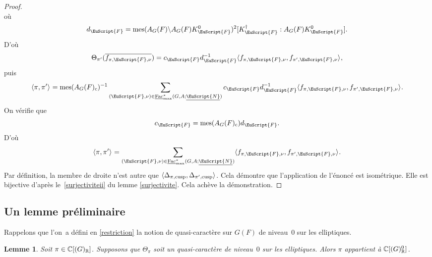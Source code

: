 \documentclass[JEP,XML,SOM,Unicode,francais]{cedram}
\let\mathcal \EuScript
\newcommand{\NoChangel}[1]{%
\expandafter\let\csname old\string#1\endcsname=#1
\let#1=\relax
\newcommand{#1}{\mathcode`l="716C\csname old\string#1\endcsname\mathcode`l="7160 }%
}
\let\<\langle
\let\>\rangle
\newcommand{\rc}{\mathrm{c}}
\newcommand{\cusp}{\mathrm{cusp}}
\newcommand{\rell}{\mathrm{ell}} \NoChangel{\rell}
\newcommand{\Ell}{\mathrm{Ell}} \NoChangel{\Ell}
\newcommand{\Fac}{\mathrm{Fac}}
\DeclareMathOperator{\mes}{mes}
\newcommand{\cF}{\mathcal{F}}
\newcommand{\cN}{\mathcal{N}}
\newcommand{\CC}{\mathbb{C}}
\newcommand{\RR}{\mathbb{R}}
\theoremstyle{plain}
\newtheorem*{lem*}{Lemme}
\theoremstyle{definition}
\begin{document}
\begin{proof}
\[\]
où
\[
d_{\cF}=\mes(A_{G}(F)\backslash A_{G}(F)K_{\cF}^0)^2[K_{\cF}^{\dag}:A_{G}(F)K_{\cF}^0].
\]
D'où
\[
\Theta_{\pi'}(\overline{f_{\pi,\cF,\nu}})= c_{\cF}d_{\cF}^{-1}\<f_{\pi,\cF,\nu},f_{\pi',\cF,\nu}\>_{\rell},
\]
puis
\[
\<\pi,\pi'\>_{\rell}=\mes(A_{G}(F)_{\rc})^{-1}\sum_{(\cF,\nu)\in \underline{\Fac}^*_{\max}(G,A;\underline{\cN})} c_{\cF}d_{\cF}^{-1}\<f_{\pi,\cF,\nu},f_{\pi',\cF,\nu}\>_{\rell}.
\]
On vérifie que
\[
c_{\cF}=\mes(A_{G}(F)_{\rc}) d_{\cF}.
\]
D'où
\[
\<\pi,\pi'\>_{\rell}=\sum_{(\cF,\nu)\in \underline{\Fac}^*_{\max}(G,A;\underline{\cN})}\<f_{\pi,\cF,\nu},f_{\pi',\cF,\nu}\>_{\rell}.
\]
Par définition, la membre de droite n'est autre que $\<\Delta_{\pi,\cusp},\Delta_{\pi',\cusp}\>_{\rell}$. Cela démontre que l'application de l'énoncé est isométrique. Elle est bijective d'après le~\eqref{surjectiviteii} du lemme \ref{surjectivite}. Cela achève la démonstration.
\end{proof}

\subsection{Un lemme préliminaire}\label{unlemme}

Rappelons que l'on~a défini en \ref{restriction} la notion de quasi-caractère sur $G(F)$ de niveau~$0$ sur les elliptiques.

\begin{lem*}
Soit $\pi\in \CC[\Ell(G)_{\RR}]$. Supposons que $\Theta_{\pi}$ soit un quasi-caractère de niveau~$0$ sur les elliptiques. Alors $\pi$ appartient à $\CC[\Ell(G)^0_{\RR}]$.
\end{lem*}
\end{document}
